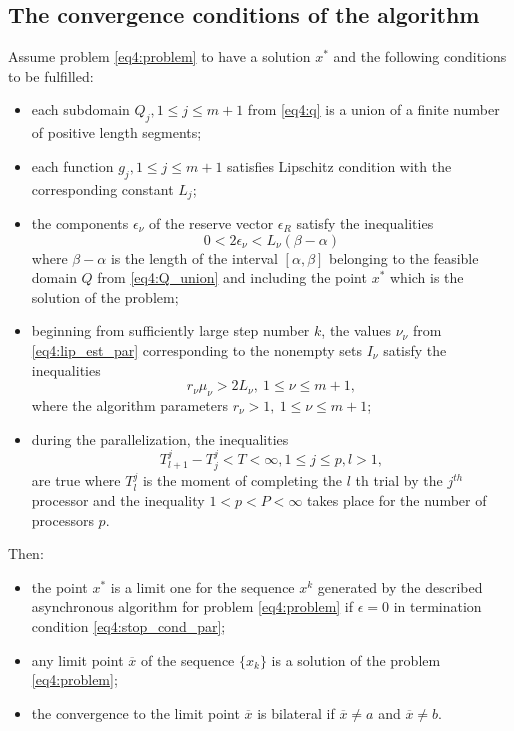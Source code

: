 \documentclass[graybox]{svmult}
\begin{document}
\subsection{The convergence conditions of the algorithm}
\begin{theorem}
  \label{th4:convergence_par}
  Assume problem \eqref{eq4:problem} to have a solution $x^*$ and the following conditions to be fulfilled:
  \begin{itemize}
    \item each subdomain $Q_j ,1\le j\le m+1$ from \eqref{eq4:q} is a union of a finite number of positive length segments;
    \item each function $g_j ,1\le j\le m+1$ satisfies Lipschitz condition with the corresponding constant $L_j$;
    \item the components $\epsilon_\nu$ of the reserve vector $\epsilon_R$ satisfy the inequalities
    \begin{equation}
      \label{eq4:reserves_par}
      0<2\epsilon_\nu<L_\nu(\beta-\alpha)
    \end{equation}
    where $\beta-\alpha$ is the length of the interval $[\alpha,\beta]$ belonging to the feasible domain $Q$ from \eqref{eq4:Q_union} and including the point $x^*$ which is the solution of the problem;
    \item beginning from sufficiently large step number $k$, the values $\nu_\nu$ from \eqref{eq4:lip_est_par} corresponding to the nonempty sets $I_\nu$ satisfy the inequalities
    \begin{equation}
      r_\nu\mu_\nu>2L_\nu,\:1\le\nu\le m+1,
    \end{equation}
    where the algorithm parameters $r_\nu>1,\:1\le\nu\le m+1$;
    \item during the parallelization, the inequalities
    \begin{displaymath}
      T^j_{l+1}-T^j_j<T<\infty,1\le j\le p, l>1,
    \end{displaymath}
    are true where $T_l^j$ is the moment of completing the $l$ th trial by the $j^{th}$ processor and the inequality $1<p<P<\infty$ takes place for the number of processors $p$.
  \end{itemize}
  Then:
  \begin{itemize}
    \item the point $x^*$ is a limit one for the sequence ${x^k }$ generated by the described asynchronous algorithm for problem \eqref{eq4:problem} if $\epsilon=0$ in termination condition \eqref{eq4:stop_cond_par};
    \item any limit point $\overline x$ of the sequence $\{x_k \}$ is a solution of the problem \eqref{eq4:problem};
    \item the convergence to the limit point $\overline x$ is bilateral if $\overline x\not=a$ and $\overline x\not=b$.
  \end{itemize}
\end{theorem}
\end{document}
